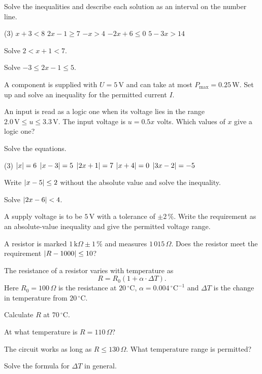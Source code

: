 Solve the inequalities and describe each solution as an interval on the number line.
\begin{delar}(3)
  \task $x + 3 < 8$
  \task $2x - 1 \geq 7$
  \task $-x > 4$
  \task $-2x + 6 \leq 0$
  \task $5 - 3x > 14$
\end{delar}

\begin{parts}
  \item Solve $2 < x + 1 < 7$.
  \item Solve $-3 \leq 2x - 1 \leq 5$.
  \item A component is supplied with $U = 5\,\text{V}$ and can take at most
    $P_{\max} = 0.25\,\text{W}$. Set up and solve an inequality for the permitted current $I$.
  \item An input is read as a logic one when its voltage lies in the range
    $2.0\,\text{V} \leq u \leq 3.3\,\text{V}$. The input voltage is $u = 0.5x$ volts. Which
    values of $x$ give a logic one?
\end{parts}

Solve the equations.
\begin{delar}(3)
  \task $\lvert x\rvert = 6$
  \task $\lvert x - 3\rvert = 5$
  \task $\lvert2x + 1\rvert = 7$
  \task $\lvert x + 4\rvert = 0$
  \task $\lvert3x - 2\rvert = -5$
\end{delar}

\begin{parts}
  \item Write $\lvert x - 5\rvert \leq 2$ without the absolute value and solve the inequality.
  \item Solve $\lvert2x - 6\rvert < 4$.
  \item A supply voltage is to be $5\,\text{V}$ with a tolerance of $\pm 2\,\%$. Write the
    requirement as an absolute-value inequality and give the permitted voltage range.
  \item A resistor is marked $1\,\text{k}\Omega \pm 1\,\%$ and measures $1\,015\,\Omega$. Does
    the resistor meet the requirement ${\lvert R - 1000\rvert \leq 10}$?
\end{parts}

The resistance of a resistor varies with temperature as
\[
  R = R_0(1 + \alpha \cdot \Delta T).
\]
Here $R_0 = 100\,\Omega$ is the resistance at $20\,{}^{\circ}\text{C}$,
$\alpha = 0.004\,{}^{\circ}\text{C}^{-1}$ and $\Delta T$ is the change in temperature from
$20\,{}^{\circ}\text{C}$.
\begin{parts}
  \item Calculate $R$ at $70\,{}^{\circ}\text{C}$.
  \item At what temperature is $R = 110\,\Omega$?
  \item The circuit works as long as $R \leq 130\,\Omega$. What temperature range is permitted?
  \item Solve the formula for $\Delta T$ in general.
\end{parts}
